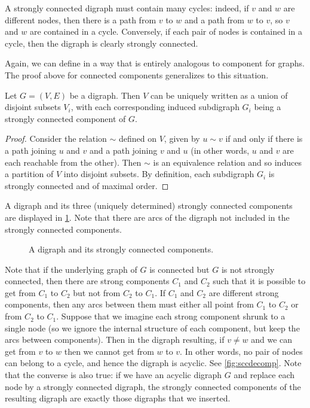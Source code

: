 A strongly connected digraph must contain many cycles: indeed, if $v$ and
$w$ are different nodes, then there is a path from $v$ to $w$ and a path
from $w$ to $v$, so $v$ and $w$ are contained in a cycle. Conversely, if
each pair of nodes is contained in a cycle, then the digraph is clearly
strongly connected.

Again, we can define  in a
way that is entirely analogous to component for graphs. The proof
above for connected components generalizes to this situation.

\begin{Theorem}
\label{thm:scc}
Let $G=(V, E)$ be a digraph. Then $V$ can be uniquely written as a union of
disjoint subsets $V_i$, with each corresponding induced subdigraph $G_i$ being
a strongly connected component of $G$.
\end{Theorem}

\begin{proof} Consider the relation $\sim$ defined on $V$, given by
$u\sim v$ if and only if there is a path joining $u$ and $v$ and a path
joining $v$ and $u$ (in other words, $u$ and $v$ are each reachable
from the other). Then $\sim$ is an equivalence relation and so induces
a partition of $V$ into disjoint subsets.  By definition, each 
subdigraph $G_i$ is strongly connected and of maximal order.
\end{proof}

\begin{Example}\label{eg:scc}
A digraph and its three (uniquely determined) strongly connected
components are displayed in \cref{fig:scc}. Note that there are
arcs of the digraph not included in the strongly connected components.
\end{Example}

\begin{figure}[htbp]

\caption{A digraph and its strongly connected components.}
\label{fig:scc}
\end{figure}

Note that if the underlying graph of $G$ is connected but $G$ is
not strongly connected, then  there are strong components $C_1$ and
$C_2$ such that it is possible to get from $C_1$ to $C_2$ but not
from $C_2$ to $C_1$. If $C_1$ and $C_2$ are different strong
components, then any arcs between them must either all point from
$C_1$ to $C_2$ or from $C_2$ to $C_1$.  Suppose that we imagine
each strong component shrunk to a single node (so we ignore the
internal structure of each component, but keep the arcs between
components). Then in the digraph resulting, if $v\neq w$ and we can
get from $v$ to $w$ then we cannot get from $w$ to $v$. In other
words, no pair of nodes can belong to a cycle, and hence the digraph
is acyclic. See \cref{fig:sccdecomp}. Note that the converse
is also true: if we have an acyclic digraph $G$ and replace each
node by a strongly connected digraph, the strongly connected
components of the resulting digraph are exactly those digraphs that
we inserted.

